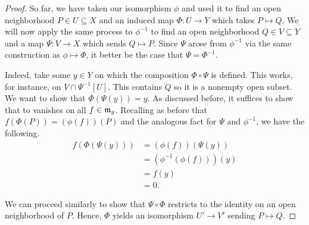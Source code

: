 \begin{proof}
    So far, we have taken our isomorphism $\phi$ and used it to find an open neighborhood $P \in U \subseteq X$ and an induced map $\Phi: U \longrightarrow Y$ which takes $P \mapsto Q$. We will now apply the same process to $\phi^{-1}$ to find an open neighborhood $Q \in V \subseteq Y$ and a map $\Psi: V \longrightarrow X$ which sends $Q \mapsto P$. Since $\Psi$ arose from $\phi^{-1}$ via the same construction as $\phi \mapsto \Phi$, it better be the case that $\Psi = \Phi^{-1}$.

    Indeed, take some $y \in Y$ on which the composition $\Phi \circ \Psi$ is defined. This works, for instance, on $V \cap \Psi^{-1}[U]$. This contains $Q$ so it is a nonempty open subset. We want to show that $\Phi(\Psi(y)) = y$. As discussed before, it suffices to show that to vanishes on all $f \in \mathfrak m_y$. Recalling as before that $f(\Phi(P)) = (\phi(f))(P)$ and the analogous fact for $\Psi$ and $\phi^{-1}$, we have the following.
    \begin{align*}
        f(\Phi(\Psi(y))) &= (\phi(f))(\Psi(y))\\
        &= (\phi^{-1}(\phi(f)))(y)\\
        &= f(y)\\
        &= 0.
    \end{align*}

    We can proceed similarly to show that $\Psi \circ \Phi$ restricts to the identity on an open neighborhood of $P$. Hence, $\Phi$ yields an isomorphism $U' \longrightarrow V'$ sending $P \mapsto Q$.
\end{proof}
